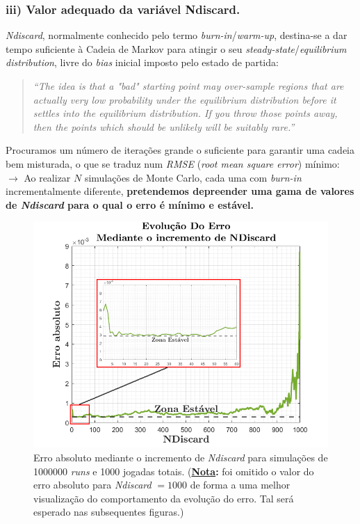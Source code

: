 \vspace{-1.5em}
\subsubsection{iii) Valor adequado da variável Ndiscard.}
\label{subsubsec:P2iii}

\textit{Ndiscard}, normalmente conhecido pelo termo \textit{burn-in}/\textit{warm-up}, destina-se a dar tempo suficiente à Cadeia de Markov para atingir o seu \textit{steady-state}/\textit{equilibrium distribution}, livre do \textit{bias} inicial imposto pelo estado de partida:

\begin{quote}
 \textit{``The idea is that a "bad" starting point may over-sample regions that are actually very low probability under the equilibrium distribution before it settles into the equilibrium distribution. If you throw those points away, then the points which should be unlikely will be suitably rare.''}\cite{amelio}
\end{quote}

Procuramos um número de iterações grande o suficiente para garantir uma cadeia bem misturada, o que se traduz num \textit{RMSE} (\textit{root mean square error}) mínimo:
\newpage
$\rightarrow$ Ao realizar $N$ simulações de Monte Carlo\footnotemark[4], cada uma com \textit{burn-in} incrementalmente diferente, \textbf{pretendemos depreender uma gama de valores de \textit{Ndiscard} para o qual o erro é mínimo e estável.}

\begin{figure}[H]
    \centering
    \includegraphics[width = 0.6\linewidth]{img/P2/P2iii.png}
    \caption{Erro absoluto mediante o incremento de \textit{Ndiscard} para simulações de 1000000 \textit{runs} e 1000 jogadas totais. (\textbf{\underline{Nota}:} foi omitido o valor do erro absoluto para \textit{Ndiscard }$= 1000$ de forma a uma melhor visualização do comportamento da evolução do erro. Tal será esperado nas subsequentes figuras.)}
    \label{fig:P2iii}
\end{figure}


